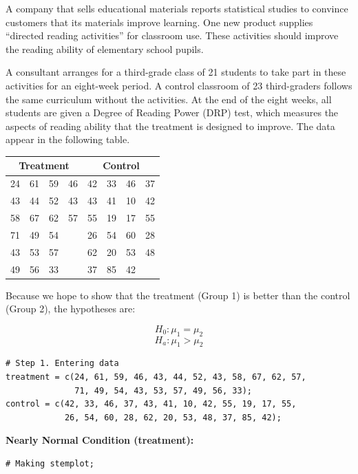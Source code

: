 \begin{example}
A company that sells educational materials reports statistical studies to convince customers that its materials improve learning. One new product supplies ``directed reading activities'' for classroom use. These activities should improve the reading ability of elementary school pupils.

A consultant arranges for a third-grade class of 21 students to take part in these activities for an eight-week period. A control classroom of 23 third-graders follows the same curriculum without the activities. At the end of the eight weeks, all students are given a Degree of Reading Power (DRP) test, which measures the aspects of reading ability that the treatment is designed to improve. The data appear in the following table.

\begin{center}
\begin{tabular}{cccccccc}
\toprule
\multicolumn{4}{c}{\textbf{Treatment}} & \multicolumn{4}{c}{\textbf{Control}} \\
\midrule
24 & 61 & 59 & 46 & 42 & 33 & 46 & 37 \\
43 & 44 & 52 & 43 & 43 & 41 & 10 & 42 \\
58 & 67 & 62 & 57 & 55 & 19 & 17 & 55 \\
71 & 49 & 54 &    & 26 & 54 & 60 & 28 \\
43 & 53 & 57 &    & 62 & 20 & 53 & 48 \\
49 & 56 & 33 &    & 37 & 85 & 42 &    \\
\bottomrule
\end{tabular}
\end{center}

Because we hope to show that the treatment (Group 1) is better than the control (Group 2), the hypotheses are:

\[H_0 : \mu_1 = \mu_2\]
\[H_a : \mu_1 > \mu_2\]

\begin{tcolorbox}[colback=gray!10, colframe=black!45, arc=2mm, before skip=4pt, after skip=4pt]
\begin{verbatim}
# Step 1. Entering data
treatment = c(24, 61, 59, 46, 43, 44, 52, 43, 58, 67, 62, 57, 
              71, 49, 54, 43, 53, 57, 49, 56, 33);
control = c(42, 33, 46, 37, 43, 41, 10, 42, 55, 19, 17, 55, 
            26, 54, 60, 28, 62, 20, 53, 48, 37, 85, 42);
\end{verbatim}
\end{tcolorbox}
\noindent\textbf{Nearly Normal Condition (treatment):}
\begin{tcolorbox}[colback=gray!10, colframe=black!45, arc=2mm, before skip=4pt, after skip=4pt]
\begin{verbatim}
# Making stemplot;


\end{verbatim}
\end{tcolorbox}
\end{example}
